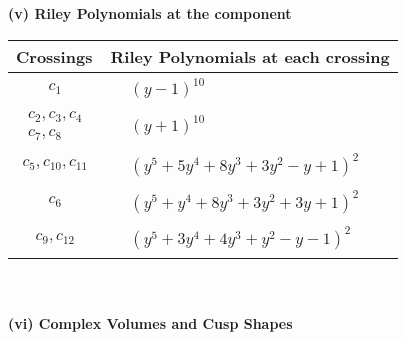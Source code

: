 \documentclass[1p]{elsarticle_modified}
\theoremstyle{definition}
\begin{document}
\newpage\renewcommand{\arraystretch}{1}
\flushleft \textbf{(v) Riley Polynomials at the component}\newline \\
\begin{tabular}{m{50pt}|m{274pt}}
Crossings & \hspace{64pt}Riley Polynomials at each crossing \\
\hline $$\begin{aligned}c_{1}\end{aligned}$$&$\begin{aligned}
&(y-1)^{10}
\end{aligned}$\\
\hline $$\begin{aligned}c_{2},c_{3},c_{4}\\c_{7},c_{8}\end{aligned}$$&$\begin{aligned}
&(y+1)^{10}
\end{aligned}$\\
\hline $$\begin{aligned}c_{5},c_{10},c_{11}\end{aligned}$$&$\begin{aligned}
&(y^5+5 y^4+8 y^3+3 y^2- y+1)^2
\end{aligned}$\\
\hline $$\begin{aligned}c_{6}\end{aligned}$$&$\begin{aligned}
&(y^5+y^4+8 y^3+3 y^2+3 y+1)^2
\end{aligned}$\\
\hline $$\begin{aligned}c_{9},c_{12}\end{aligned}$$&$\begin{aligned}
&(y^5+3 y^4+4 y^3+y^2- y-1)^2
\end{aligned}$\\
\hline
\end{tabular}\\~\\
\newpage\flushleft \textbf{(vi) Complex Volumes and Cusp Shapes}
\end{document}

